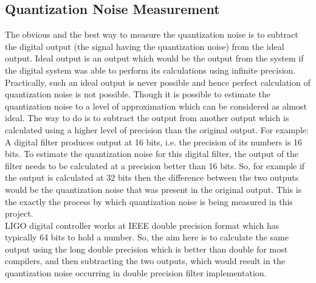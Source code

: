 \documentclass[colorlinks=true,pdfstartview=FitV,linkcolor=blue,
            citecolor=red,urlcolor=magenta]{ligodoc}
\begin{document}
	\subsection{Quantization Noise Measurement} The obvious and the best way to measure the quantization noise is to subtract the digital output (the signal having the quantization noise) from the ideal output. Ideal output is an output which would be the output from the system if the digital system was able to perform its calculations using infinite precision. Practically, such an ideal output is never possible and hence perfect calculation of quantization noise is not possible. Though it is possible to estimate the quantization noise to a level of approximation which can be considered as almost ideal. The way to do is to subtract the output from another output which is calculated using a higher level of precision than the original output. For example: A digital filter produces output at 16 bits, i.e. the precision of its numbers is 16 bits. To estimate the quantization noise for this digital filter, the output of the filter needs to be calculated at a precision better than 16 bits. So, for example if the output is calculated at 32 bits then the difference between the two outputs would be the quantization noise that was present in the original output. This is the exactly the process by which quantization noise is being measured in this project.\\
	LIGO digital controller works at IEEE double precision format \cite{double} which has typically 64 bits to hold a number. So, the aim here is to calculate the same output using the long double precision which is better than double for most \cite{longdouble} compilers, and then subtracting the two outputs, which would result in the quantization noise occurring in double precision filter implementation.
\end{document}

